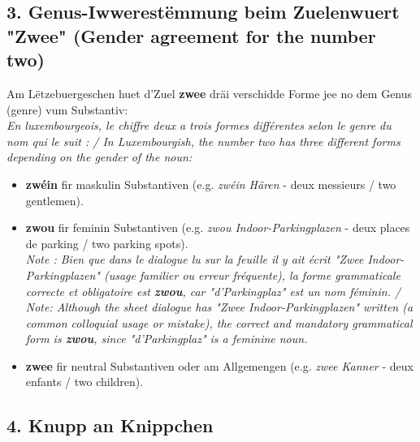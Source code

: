 \subsection*{3. Genus-Iwwerestëmmung beim Zuelenwuert "Zwee" (Gender agreement for the number two)}

Am Lëtzebuergeschen huet d'Zuel \textbf{zwee} dräi verschidde Forme jee no dem Genus (genre) vum Substantiv: \\
\textit{En luxembourgeois, le chiffre deux a trois formes différentes selon le genre du nom qui le suit : / In Luxembourgish, the number two has three different forms depending on the gender of the noun:}
\begin{itemize}
    \item \textbf{zwéin} fir maskulin Substantiven (e.g. \textit{zwéin Hären} - deux messieurs / two gentlemen).
    \item \textbf{zwou} fir feminin Substantiven (e.g. \textit{zwou Indoor-Parkingplazen} - deux places de parking / two parking spots). \\
    \textit{Note : Bien que dans le dialogue lu sur la feuille il y ait écrit "Zwee Indoor-Parkingplazen" (usage familier ou erreur fréquente), la forme grammaticale correcte et obligatoire est \textbf{zwou}, car "d'Parkingplaz" est un nom féminin. / Note: Although the sheet dialogue has "Zwee Indoor-Parkingplazen" written (a common colloquial usage or mistake), the correct and mandatory grammatical form is \textbf{zwou}, since "d'Parkingplaz" is a feminine noun.}
    \item \textbf{zwee} fir neutral Substantiven oder am Allgemengen (e.g. \textit{zwee Kanner} - deux enfants / two children).
\end{itemize}

\subsection*{4. Knupp an Knippchen}

